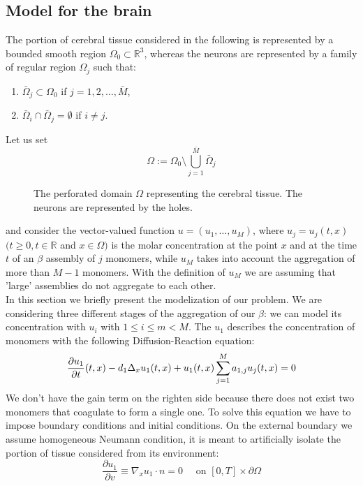 \subsection{Model for the brain}
The portion of cerebral tissue considered  in the following is represented by a bounded smooth region $\Omega_{0}\subset \mathbb{R}^3$, whereas the neurons are represented by a family of regular region $\Omega_{j}$ such that:
\begin{enumerate}[label=(\roman*)]
    \item $\bar\Omega_{j}\subset \Omega_{0}$  if   $j=1,2,\dots,\bar{M}$,\\
    \item $\bar\Omega_{i}\cap \bar\Omega_{j}= \emptyset$  if $i\neq j$.\\
\end{enumerate}
Let us set 
$$
\Omega := \Omega_{0} \setminus
\bigcup_{j=1}^{\bar M} \bar\Omega_{j}
$$
\begin{figure}[H]
    \centering
    \caption{The perforated domain $\Omega$ representing the cerebral tissue. The neurons are represented by the holes.}
    \label{fig:perforated_domain}
  \end{figure}
and consider the vector-valued function $u=(u_1,\dots, u_M)$, where $u_j=u_j(t,x)$ $(t\geq 0, t\in \mathbb{R}$ and $x\in \Omega)$ is the molar concentration at the point $x$ and at the time $t$ of an \(\beta\) assembly of $j$ monomers, while $u_M$ takes into account the aggregation of more than $M-1$ monomers. With the definition of $u_M$ we are assuming that 'large' assemblies do not aggregate to each other.\\
In this section we briefly present the modelization of our problem. We are considering three different stages of the aggregation of our \(\beta\): we can model its concentration with $u_{i}$ with $1\leq i \leq m < M$.
The $u_{1}$ describes the concentration of monomers with the following Diffusion-Reaction equation: 
$$
\frac{\partial u_{1}}{\partial t}(t, x)-d_{1} \Delta_{x} u_{1}(t, x)+u_{1}(t, x) \sum_{j=1}^{M} a_{1, j} u_{j}(t, x)=0\\
$$
We don't have the gain term on the righten side because there does not exist two monomers that coagulate to form a single one.
To solve this equation we have to impose boundary conditions and initial conditions.
On the external boundary we assume homogeneous Neumann condition, it is meant to artificially isolate the portion of tissue considered from its environment:
$$
\frac{\partial u_1}{\partial v} \equiv \nabla_{x} u_1\cdot n=0 \quad \text { on }[0, T] \times \partial \Omega$$
